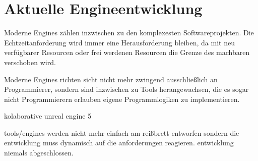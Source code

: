 \chapter{Aktuelle Engineentwicklung}
\label{chap:engine-ueberblick}

Moderne Engines zählen inzwischen zu den komplexesten Softwareprojekten. Die Echtzeitanforderung wird immer eine Herausforderung bleiben, da mit neu verfügbarer Resourcen oder frei werdenen Resourcen die Grenze des machbaren verschoben wird.

Moderne Engines richten sicht nicht mehr zwingend ausschließlich an Programmierer, sondern sind inzwischen zu Tools herangewachsen, die es sogar nicht Programmierern erlauben eigene Programmlogiken zu implementieren.

kolaborative unreal engine 5

tools/engines werden nicht mehr einfach am reißbrett entworfen sondern die entwicklung muss dynamisch auf die anforderungen reagieren.
entwicklung niemals abgeschlossen. 
